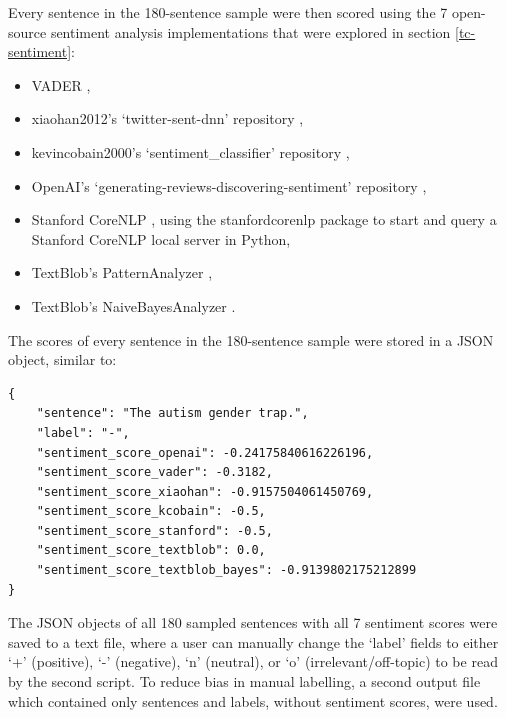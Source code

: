 \documentclass{report}
\begin{document}
Every sentence in the 180-sentence sample were then scored using the 7 open-source sentiment analysis implementations that were explored in section \ref{tc-sentiment}:
\begin{itemize}
	\item VADER \cite{VADER},
	\item xiaohan2012's `twitter-sent-dnn' repository \cite{kalchbrennerACL2014},
	\item kevincobain2000's `sentiment\_classifier' repository \cite{kevincobain},
	\item OpenAI's `generating-reviews-discovering-sentiment' repository \cite{OpenAI},
	\item Stanford CoreNLP \cite{StanfordNLP}, using the stanfordcorenlp package \cite{stanfordcorenlp} to start and query a Stanford CoreNLP local server in Python,
	\item TextBlob's PatternAnalyzer \cite{textblob},
	\item TextBlob's NaiveBayesAnalyzer \cite{textblob}.
\end{itemize}

The scores of every sentence in the 180-sentence sample were stored in a JSON object, similar to:
\begin{lstlisting}
{
	"sentence": "The autism gender trap.",
	"label": "-",
	"sentiment_score_openai": -0.24175840616226196,
	"sentiment_score_vader": -0.3182,
	"sentiment_score_xiaohan": -0.9157504061450769,
	"sentiment_score_kcobain": -0.5,
	"sentiment_score_stanford": -0.5,
	"sentiment_score_textblob": 0.0,
	"sentiment_score_textblob_bayes": -0.9139802175212899
}
\end{lstlisting}

The JSON objects of all 180 sampled sentences with all 7 sentiment scores were saved to a text file, where a user can manually change the `label' fields to either `+' (positive), `-' (negative), `n' (neutral), or `o' (irrelevant/off-topic) to be read by the second script.
To reduce bias in manual labelling, a second output file which contained only sentences and labels, without sentiment scores, were used.
\end{document}
